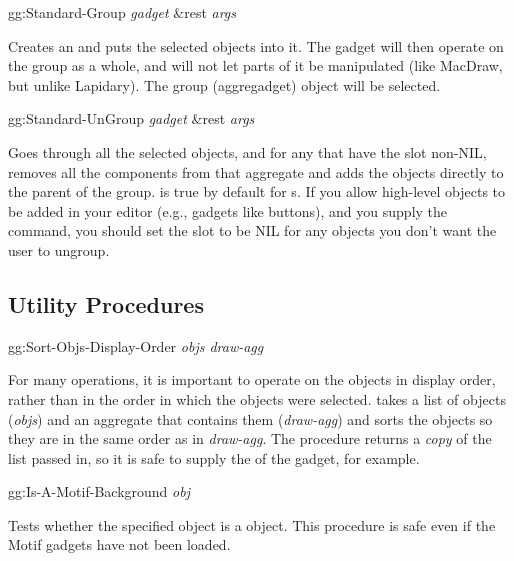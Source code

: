 \begin{programexample}
gg:Standard-Group {\it gadget} \&rest {\it args} \value{function}
\end{programexample}
Creates an  and puts the selected objects into it.
The  gadget will then operate on the
group as a whole, and will not let parts of it be manipulated (like
MacDraw, but unlike Lapidary).  The group (aggregadget) object will be
selected.

\begin{programexample}
gg:Standard-UnGroup {\it gadget} \&rest {\it args} \value{function}
\end{programexample}
Goes through all the selected objects, and for any that have the
 slot non-NIL, removes all the components from that
aggregate and adds the objects directly to the parent of the group.
 is true by default for s.  If you allow
high-level objects to be added
in your editor (e.g., gadgets like buttons), and you supply the
 command, you should set the  slot to be NIL
for any objects you don't want the user to ungroup.

\subsection{Utility Procedures}

\begin{programexample}
gg:Sort-Objs-Display-Order {\it objs draw-agg} \value{function}
\end{programexample}
For many operations, it is important to operate on the objects in
display order, rather than in the order in which the objects were
selected.   takes a list of objects
({\it objs}) and an aggregate that contains them ({\it draw-agg}) and
sorts the objects so they are in the same order as in {\it draw-agg}.
The procedure returns a {\it copy} of the list passed in, so it is safe
to supply the  of the  gadget,
for example.

\begin{programexample}
gg:Is-A-Motif-Background {\it obj} \value{function}
\end{programexample}
Tests whether the specified object is a  object.
This procedure is safe even if the Motif gadgets have not been loaded.

